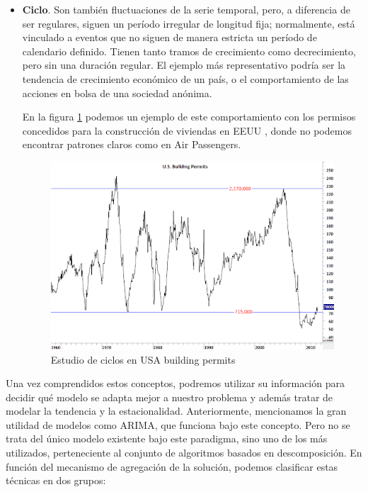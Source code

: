\begin{itemize}
    \item \textbf{Ciclo}. Son también fluctuaciones de la serie temporal, pero, a diferencia de ser regulares, siguen un período irregular de longitud fija; normalmente, está vinculado a eventos que no siguen de manera estricta un período de calendario definido. Tienen tanto tramos de crecimiento como decrecimiento, pero sin una duración regular. El ejemplo más representativo podría ser la tendencia de crecimiento económico de un país, o el comportamiento de las acciones en bolsa de una sociedad anónima.

    En la figura \ref{ciclo} podemos un ejemplo de este comportamiento con los permisos concedidos para la construcción de viviendas en EEUU \cite{techcharts2012housing}, donde no podemos encontrar patrones claros como en Air Passengers.

    \begin{figure}[H] %
        \centering
        \includegraphics[scale=0.55]{img/ciclo}
        \caption{Estudio de ciclos en USA building permits}
        \label{ciclo}
    \end{figure}

\end{itemize}

Una vez comprendidos estos conceptos, podremos utilizar su información para decidir qué modelo se adapta mejor a nuestro problema y además tratar de modelar la tendencia y la estacionalidad. Anteriormente, mencionamos la gran utilidad de modelos como ARIMA, que funciona bajo este concepto. Pero no se trata del único modelo existente bajo este paradigma, sino uno de los más utilizados, perteneciente al conjunto de algoritmos basados en descomposición. En función del mecanismo de agregación de la solución, podemos clasificar estas técnicas en dos grupos:

